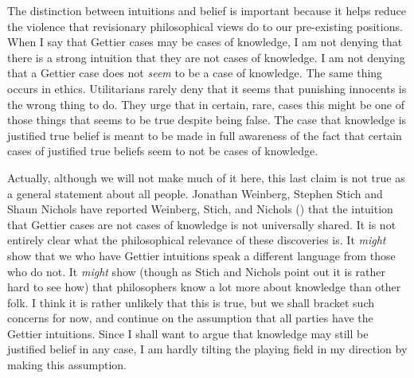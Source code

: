 \documentclass[
  11pt,
  letterpaper,
  DIV=11,
  numbers=noendperiod,
  oneside]{scrartcl}
\begin{document}
The distinction between intuitions and belief is important because it
helps reduce the violence that revisionary philosophical views do to our
pre-existing positions. When I say that Gettier cases may be cases of
knowledge, I am not denying that there is a strong intuition that they
are not cases of knowledge. I am not denying that a Gettier case does
not \emph{seem} to be a case of knowledge. The same thing occurs in
ethics. Utilitarians rarely deny that it seems that punishing innocents
is the wrong thing to do. They urge that in certain, rare, cases this
might be one of those things that seems to be true despite being false.
The case that knowledge is justified true belief is meant to be made in
full awareness of the fact that certain cases of justified true beliefs
seem to not be cases of knowledge.

Actually, although we will not make much of it here, this last claim is
not true as a general statement about all people. Jonathan Weinberg,
Stephen Stich and Shaun Nichols have reported Weinberg, Stich, and
Nichols () that the intuition that
Gettier cases are not cases of knowledge is not universally shared. It
is not entirely clear what the philosophical relevance of these
discoveries is. It \emph{might} show that we who have Gettier intuitions
speak a different language from those who do not. It \emph{might} show
(though as Stich and Nichols point out it is rather hard to see how)
that philosophers know a lot more about knowledge than other folk. I
think it is rather unlikely that this is true, but we shall bracket such
concerns for now, and continue on the assumption that all parties have
the Gettier intuitions. Since I shall want to argue that knowledge may
still be justified belief in any case, I am hardly tilting the playing
field in my direction by making this assumption.
\end{document}
